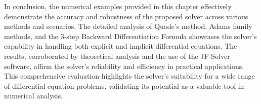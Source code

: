 \newpage
In conclusion, the numerical examples provided in this chapter effectively demonstrate the accuracy and robustness of the proposed solver across various methods and scenarios. The detailed analysis of Quade's method, Adams family methods, and the 3-step Backward Differentiation Formula showcases the solver's capability in handling both explicit and implicit differential equations. The results, corroborated by theoretical analysis and the use of the JF-Solver software, affirm the solver's reliability and efficiency in practical applications. This comprehensive evaluation highlights the solver's suitability for a wide range of differential equation problems, validating its potential as a valuable tool in numerical analysis.

